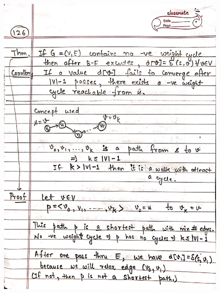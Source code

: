 \begin{figure}[H]
    \centering
    \includegraphics[width=16cm, height=21cm]{"./MIT-6.006/MIT-6006-126"}
\end{figure}
\newpage
